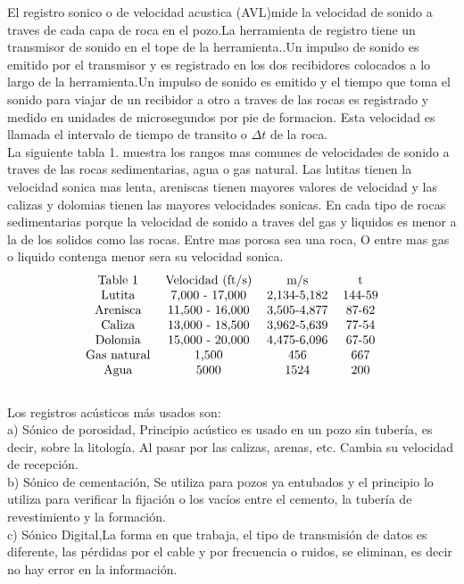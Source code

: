 \documentclass[10pt,a4paper]{report}
\begin{document}
\newpage
El registro sonico o de velocidad acustica (AVL)mide la velocidad de sonido a traves de cada capa de roca en el pozo.La herramienta de registro tiene un transmisor de sonido en el tope de la herramienta..Un impulso de sonido es emitido por el transmisor y es registrado en los dos recibidores colocados a lo largo de la herramienta.Un impulso de sonido es emitido y el tiempo que toma el sonido para viajar de un recibidor a otro a traves de las rocas es registrado y medido en unidades de microsegundos por pie de formacion. Esta velocidad es llamada el intervalo de tiempo de transito o $\Delta t$ de la roca.
\\ La siguiente tabla 1. muestra los rangos mas comunes de velocidades de sonido a traves de las rocas sedimentarias, agua o gas natural. Las lutitas tienen la velocidad sonica mas lenta, areniscas tienen mayores valores de velocidad y las calizas y dolomias tienen las mayores velocidades sonicas. En cada tipo de rocas sedimentarias porque la velocidad de sonido a traves del gas y liquidos es menor a la de los solidos como las rocas. Entre mas porosa sea una roca, O entre mas gas o liquido contenga menor sera su velocidad sonica.
$$\begin{tabular}{ c c c c}
Table 1 & Velocidad (ft/s) & m/s & t \\
Lutita & 7,000 - 17,000 & 2,134-5,182 & 144-59 \\
Arenisca & 11,500 - 16,000 & 3,505-4,877 & 87-62 \\
Caliza & 13,000 - 18,500 & 3,962-5,639 & 77-54 \\
Dolomia & 15,000 - 20,000 & 4,475-6,096 & 67-50 \\
Gas natural & 1,500 & 456 & 667 \\
Agua & 5000 & 1524 & 200 \\
\end{tabular}$$ 
\\
Los registros acústicos más usados son:
\\ a) Sónico de porosidad, Principio acústico es usado en un pozo sin tubería, es decir, sobre la litología. Al pasar por las calizas, arenas, etc. Cambia su velocidad de recepción.
\\ b) Sónico de cementación, Se utiliza para pozos ya entubados y el principio lo utiliza para verificar la fijación o los vacíos entre el cemento, la tubería de revestimiento y la formación.
\\ c) Sónico Digital,La forma en que trabaja, el tipo de transmisión de datos es diferente, las pérdidas por el cable y por frecuencia o ruidos, se eliminan, es decir no hay error en la información. 
\end{document}
